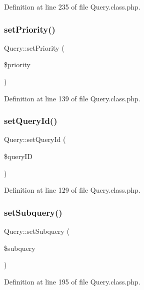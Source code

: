 Definition at line 235 of file Query.\+class.\+php.

\mbox{\label{classQuery_a6bb27fe96006304e408d51171301c4b9}} 
\subsubsection{\texorpdfstring{set\+Priority()}{setPriority()}}
{\footnotesize\ttfamily Query\+::set\+Priority (\begin{DoxyParamCaption}\item[{}]{\$priority }\end{DoxyParamCaption})}



Definition at line 139 of file Query.\+class.\+php.

\mbox{\label{classQuery_aad02b39cd751359208514261f7d320d3}} 
\subsubsection{\texorpdfstring{set\+Query\+Id()}{setQueryId()}}
{\footnotesize\ttfamily Query\+::set\+Query\+Id (\begin{DoxyParamCaption}\item[{}]{\$query\+ID }\end{DoxyParamCaption})}



Definition at line 129 of file Query.\+class.\+php.

\mbox{\label{classQuery_a98af3910bfaf6ed001572c954f28e1a5}} 
\subsubsection{\texorpdfstring{set\+Subquery()}{setSubquery()}}
{\footnotesize\ttfamily Query\+::set\+Subquery (\begin{DoxyParamCaption}\item[{}]{\$subquery }\end{DoxyParamCaption})}



Definition at line 195 of file Query.\+class.\+php.

